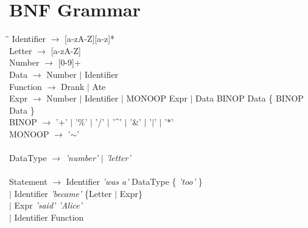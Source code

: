 \documentclass[a4wide, 11pt]{article}
\begin{document}
\section{BNF Grammar}
\label{sec:bnf}
	\begin{tabbing}
	\hspace*{9mm}\=\hspace*{25mm}\=\kill
		\> Identifier $\rightarrow$ [a-zA-Z][a-z]* \\
		\> Letter $\rightarrow$ [a-zA-Z] \\
		\> Number $\rightarrow$ [0-9]+ \\
		\> Data $\rightarrow$ Number $\mid$ Identifier \\
		\> Function $\rightarrow$ Drank $\mid$ Ate \\
		\> Expr	$\rightarrow$ Number $\mid$ Identifier $\mid$ MONOOP Expr 
					$\mid$ Data BINOP Data \{ BINOP Data \}\\
		\> BINOP $\rightarrow$ '+' $\mid$ '$\%$' $\mid$ '/' $\mid$ '\^{ }' 
							$\mid$ '$\&$' $\mid$ '$\mid$' $\mid$ '$\ast$' \\
		\> MONOOP $\rightarrow$ '$\mathtt{\sim}$'\\
		\\
		\> DataType $\rightarrow$ \emph{'number'} $\mid$ \emph{'letter'} \\
		\\
		\> Statement $\rightarrow$ Identifier \emph{'was a'} DataType \{ \emph{'too'} \}\\
		\> \> $\mid$ Identifier \emph{'became'} \{Letter $\mid$ Expr\} \\
		\> \>	$\mid$ Expr \emph{'said' 'Alice'} \\
		\> \> $\mid$ Identifier Function \\
	\end{tabbing}

\begin{verbatim}
\end{verbatim}
\end{document}
